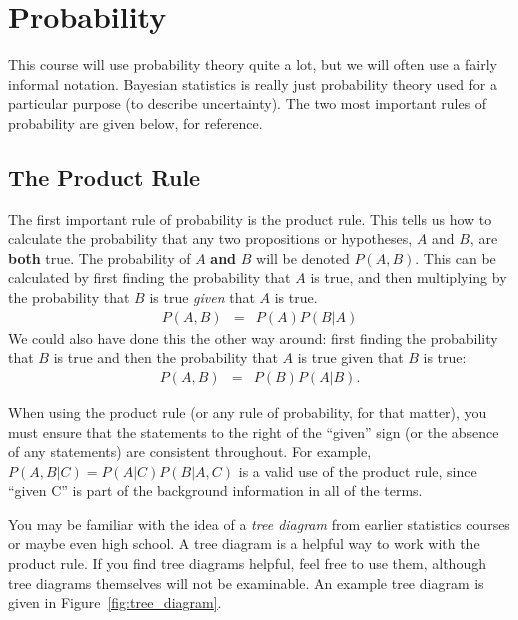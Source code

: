 \chapter{Probability}
This course will use probability theory quite a lot, but we will often use
a fairly informal notation. Bayesian
statistics is really just probability theory used for a particular purpose (to describe uncertainty). The two most important rules of probability are given below,
for reference.

\section{The Product Rule}
The first important rule of probability is the
product rule. This tells us how to calculate the probability that any two
propositions or hypotheses, $A$ and $B$, are {\bf both} true.
The probability of $A$ {\bf and}
$B$ will be denoted $P(A, B)$. This can be calculated by first finding the
probability that $A$ is true, and then multiplying by the probability that $B$
is true {\it given} that $A$ is true.
\begin{eqnarray}
P(A, B) &=& P(A)P(B|A)\label{product1}
\end{eqnarray}
We could also have done this the other way around: first finding the
probability that $B$ is true and then the probability that $A$ is true given
that $B$ is true:
\begin{eqnarray}
P(A, B) &=& P(B)P(A|B).\label{product2}
\end{eqnarray}

When using the product rule (or any rule of probability, for that matter), you
must ensure that the statements to the right of the ``given'' sign (or the
absence of any statements) are consistent throughout. For example,
$P(A, B|C) = P(A|C)P(B|A, C)$ is a valid use of the product rule, since
``given C'' is part of the background information in all of the terms.

You may be familiar with the idea of a {\it tree diagram} from earlier
statistics courses or maybe even high school. A tree diagram is a helpful way
to work with the product rule. If you find tree diagrams helpful, feel free to
use them, although tree diagrams themselves will not be examinable.
An example tree diagram is given in Figure~\ref{fig:tree_diagram}.

